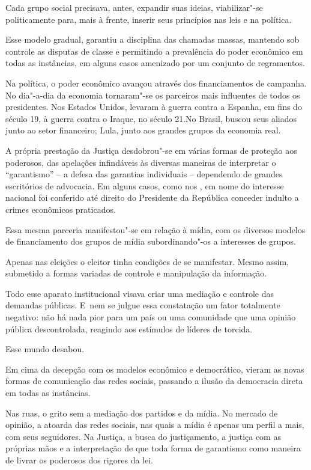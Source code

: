 Cada grupo social precisava, antes, expandir suas ideias, viabilizar"-se
politicamente para, mais à frente, inserir seus princípios nas leis e na
política.

Esse modelo gradual, garantiu a disciplina das chamadas massas, mantendo
sob controle as disputas de classe e permitindo a prevalência do poder
econômico em todas as instâncias, em alguns casos amenizado por um
conjunto de regramentos.

Na política, o poder econômico avançou através dos financiamentos de
campanha. No dia"-a-dia da economia tornaram"-se os parceiros mais
influentes de todos os presidentes. Nos Estados Unidos, levaram à guerra
contra a Espanha, em fins do século 19, à guerra contra o Iraque, no
século 21.No Brasil,  buscou seus aliados junto ao setor financeiro;
Lula, junto aos grandes grupos da economia real.

A própria prestação da Justiça desdobrou"-se em várias formas de proteção
aos poderosos, das apelações infindáveis às diversas maneiras de
interpretar o ``garantismo'' -- a defesa das garantias individuais --
dependendo de grandes escritórios de advocacia. Em alguns casos, como
nos , em nome do interesse nacional foi conferido até direito do
Presidente da República conceder indulto a crimes econômicos praticados.

Essa mesma parceria manifestou"-se em relação à mídia, com os diversos
modelos de financiamento dos grupos de mídia subordinando"-os a
interesses de grupos.

Apenas nas eleições o eleitor tinha condições de se manifestar. Mesmo
assim, submetido a formas variadas de controle e manipulação da
informação.

Todo esse aparato institucional visava criar uma mediação e controle das
demandas públicas. E~nem se julgue essa constatação um fator totalmente
negativo: não há nada pior para um país ou uma comunidade que uma
opinião pública descontrolada, reagindo aos estímulos de líderes de
torcida.

Esse mundo desabou.

Em cima da decepção com os modelos econômico e democrático, vieram as
novas formas de comunicação das redes sociais, passando a ilusão da
democracia direta em todas as instâncias.

Nas ruas, o grito sem a mediação dos partidos e da mídia. No mercado de
opinião, a atoarda das redes sociais, nas quais a mídia é apenas um
perfil a mais, com seus seguidores. Na Justiça, a busca do justiçamento,
a justiça com as próprias mãos e a interpretação de que toda forma de
garantismo como maneira de livrar os poderosos dos rigores da lei.

